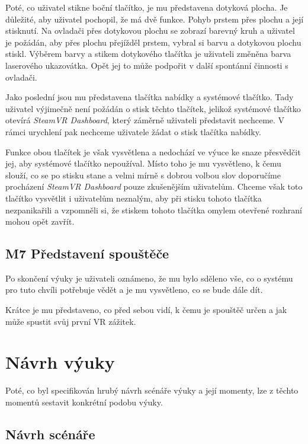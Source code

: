 Poté, co uživatel stikne boční tlačítko, je mu představena dotyková
plocha. Je důležité, aby uživatel pochopil, že má dvě funkce. Pohyb
prstem přes plochu a její stisknutí. Na ovladači přes dotykovou plochu
se zobrazí barevný kruh a uživatel je požádán, aby přes plochu přejížděl
prstem, vybral si barvu a dotykovou plochu stiskl. Výběrem barvy a
stikem dotykového tlačítka je uživateli změněna barva laserového
ukazovátka. Opět jej to může podpořit v další spontánní činnosti s
ovladači.

Jako poslední jsou mu představena tlačítka nabídky a systémové tlačítko.
Tady uživatel výjimečně není požádán o stisk těchto tlačítek, jelikož
systémové tlačítko otevírá \emph{SteamVR Dashboard}, který záměrně
uživateli představit nechceme. V rámci urychlení pak nechceme uživatele
žádat o stisk tlačítka nabídky.

Funkce obou tlačítek je však vysvětlena a nedochází ve výuce ke snaze
přesvědčit jej, aby systémové tlačítko nepoužíval. Místo toho je mu
vysvětleno, k čemu slouží, co se po stisku stane a velmi mírně s dobrou
volbou slov doporučíme procházení \emph{SteamVR Dashboard} pouze
zkušenějším uživatelům. Chceme však toto tlačítko vysvětlit i uživatelům
neznalým, aby při stisku tohoto tlačítka nezpanikařili a vzpomněli si,
že stiskem tohoto tlačítka omylem otevřené rozhraní mohou opět zavřít.

\subsection{M7 Představení
spouštěče}\label{m7-pux159edstavenuxed-spouux161tux11bux10de}

Po skončení výuky je uživateli oznámeno, že mu bylo sděleno vše, co o
systému pro tuto chvíli potřebuje vědět a je mu vysvětleno, co se bude
dále dít.

Krátce je mu představeno, co před sebou vidí, k čemu je spouštěč určen a
jak může spustit svůj první VR zážitek.

\section{Návrh výuky}\label{nuxe1vrh-vuxfduky}

Poté, co byl specifikován hrubý návrh scénáře výuky a její momenty, lze
z těchto momentů sestavit konkrétní podobu výuky.

\subsection{Návrh scénáře}\label{nuxe1vrh-scuxe9nuxe1ux159e}

